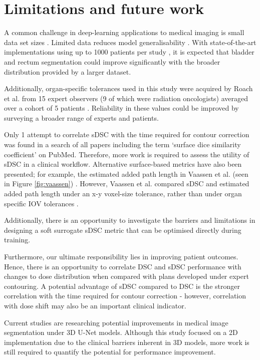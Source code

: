 \section{Limitations and future work}

A common challenge in deep-learning applications to medical imaging is small data set sizes \cite{Ronneberger_2015}. Limited data reduces model generalisability \cite{Shen2017}. With state-of-the-art implementations using up to 1000 patients per study \cite{Nikolov_2018}, it is expected that bladder and rectum segmentation could improve significantly with the broader distribution provided by a larger dataset.

Additionally, organ-specific tolerances used in this study were acquired by Roach et al. from 15 expert observers (9 of which were radiation oncologists) averaged over a cohort of 5 patients \cite{Roach_2019}. Reliability in these values could be improved by surveying a broader range of experts and patients.

Only 1 attempt to correlate sDSC with the time required for contour correction was found in a search of all papers including the term `surface dice similarity coefficient' on PubMed. Therefore, more work is required to assess the utility of sDSC in a clinical workflow. Alternative surface-based metrics have also been presented; for example, the estimated added path length in Vaassen et al. (seen in Figure \ref{fig:vaassen}) \cite{Vaassen_2020}. However, Vaassen et al. compared sDSC and estimated added path length under an x-y voxel-size tolerance, rather than under organ specific IOV tolerances \cite{Vaassen_2020}. 

Additionally, there is an opportunity to investigate the barriers and limitations in designing a soft surrogate sDSC metric that can be optimised directly during training.

Furthermore, our ultimate responsibility lies in improving patient outcomes. Hence, there is an opportunity to correlate DSC and sDSC performance with changes to dose distribution when compared with plans developed under expert contouring. A potential advantage of sDSC compared to DSC is the stronger correlation with the time required for contour correction - however, correlation with dose shift may also be an important clinical indicator.

Current studies are researching potential improvements in medical image segmentation under 3D U-Net models. Although this study focused on a 2D implementation due to the clinical barriers inherent in 3D models, more work is still required to quantify the potential for performance improvement. 

